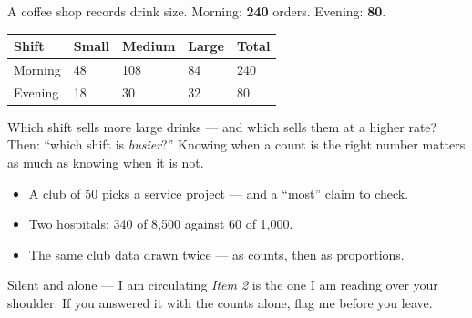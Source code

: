 \documentclass[aspectratio=169, 11pt]{beamer}
\begin{document}
\begin{frame}[t, plain]
  A coffee shop records drink size. Morning: \textbf{240} orders. Evening: \textbf{80}.
  \vspace{4pt}
  \renewcommand{\arraystretch}{1.25}
  \begin{tabularx}{\textwidth}{@{} l Y Y Y Y @{}}
    \textbf{Shift} & \textbf{Small} & \textbf{Medium} & \textbf{Large} & \textbf{Total} \\
    \hline
    Morning & 48 & 108 & 84 & 240 \\
    Evening & 18 &  30 & 32 &  80 \\
    \hline
  \end{tabularx}
  \vspace{6pt}
  \begin{block}{Which shift sells more large drinks --- and which sells them at a higher rate?}
    Then: ``which shift is \emph{busier}?''  Knowing when a
    count is the right number matters as much as knowing when it is not.
  \end{block}
\end{frame}

\begin{frame}[t, plain]
  \begin{itemize}\setlength{\itemsep}{7pt}
    \item A club of 50 picks a service project --- and a ``most'' claim to check.
    \item Two hospitals: 340 of 8{,}500 against 60 of 1{,}000.
    \item The same club data drawn twice --- as counts, then as proportions.
  \end{itemize}
  \begin{block}{Silent and alone --- I am circulating}
    \emph{Item 2} is the one I am reading over your shoulder. If you answered it with the
    counts alone, flag me before you leave.
  \end{block}
\end{frame}
\end{document}
